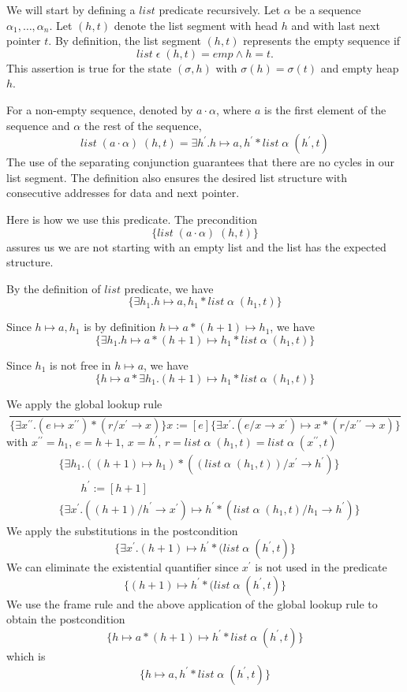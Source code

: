 \documentclass[12pt]{article}
\begin{document}
We will start by defining a $list$ predicate recursively. Let $\alpha$ be a sequence $\alpha_1, \dots, \alpha_n$. Let $(h,t)$ denote the list segment with head $h$ and with last next pointer $t$. 
By definition, the list segment $(h,t)$ represents the empty sequence if
\[ list \; \epsilon \; (h,t) = emp \wedge h=t. \] This assertion is true for the state $(\sigma,h)$ with $\sigma(h)=\sigma(t)$ and empty heap $h$.

For a non-empty sequence, denoted by $a \cdot \alpha$, where $a$ is the first element of the sequence and $\alpha$ the rest of the sequence,
\[list \; (a\cdot\alpha) \; (h,t) = \exists h^\prime.h\mapsto a,h^\prime * list \; \alpha \; (h^\prime,t)\]
The use of the separating conjunction guarantees that there are no cycles in our list segment. The definition also ensures the desired list structure with consecutive addresses for data and next pointer.

Here is how we use this predicate. The precondition 
\[ \{list \; (a\cdot\alpha) \; (h,t)\} \]
assures us we are not starting with an empty list and the list has the expected structure.

By the definition of $list$ predicate, we have
\[\{\exists h_1.h\mapsto a,h_1 * list \; \alpha \; (h_1,t)\} \]

Since $h\mapsto a, h_1$ is by definition $h\mapsto a * (h+1)\mapsto h_1$, we have
\[\{\exists h_1.h\mapsto a * (h+1) \mapsto h_1 * list \; \alpha \; (h_1,t)\} \]

Since $h_1$ is not free in $h \mapsto a$, we have
\[\{h\mapsto a * \exists h_1.(h+1) \mapsto h_1 * list \; \alpha \; (h_1,t)\} \]

We apply the global lookup rule 
\[
\frac{ }{ \{ \exists x^{\prime\prime}.(e \mapsto x^{\prime\prime}) * (r/x^\prime \to x)\}
x:=[e]
\{ \exists x^\prime. (e/x\to x^\prime) \mapsto x *(r/x^{\prime\prime} \to x) \}
 }
\]
with $x^{\prime\prime} = h_1$, $e=h+1$, $x=h^\prime$, $r=list \; \alpha  \; (h_1,t) = list \; \alpha \; (x^{\prime\prime},t)$
\begin{align*}
&\{ \exists h_1.((h+1) \mapsto h_1) * ((list \; \alpha \; (h_1,t))/x^\prime \to h^\prime)\}\\
&\qquad h^\prime:=[h+1]\\
&\{ \exists x^\prime. ((h+1)/h^\prime\to x^\prime) \mapsto h^\prime *(list \; \alpha \; (h_1,t)/h_1 \to h^\prime) \}
\end{align*}
We apply the substitutions in the postcondition
\[
\{ \exists x^\prime. (h+1) \mapsto h^\prime *(list \; \alpha \; (h^\prime,t) \}
\]
We can eliminate the existential quantifier since $x^\prime$ is not used in the predicate
\[
\{ (h+1) \mapsto h^\prime *(list \; \alpha \; (h^\prime,t) \}
\]
We use the frame rule and the above application of the global lookup rule to obtain the postcondition 
\[
\{ h\mapsto a * (h+1) \mapsto h^\prime *list \; \alpha \; (h^\prime,t) \}
\]
which is
\[
\{ h\mapsto a, h^\prime *list \; \alpha \; (h^\prime,t) \}
\]
\end{document}
